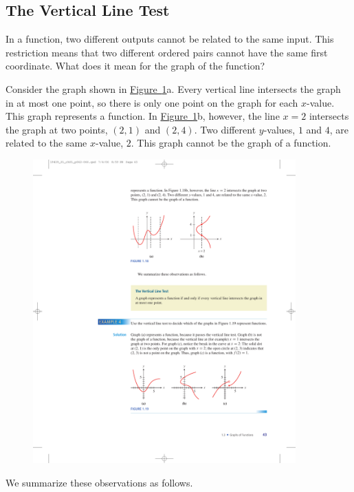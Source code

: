 \documentclass[10pt,]{book}
\theoremstyle{plain}
\theoremstyle{definition}
\theoremstyle{definition}
\theoremstyle{definition}
\theoremstyle{definition}
\theoremstyle{definition}
\numberwithin{equation}{section}
\begin{document}
\subsection[The Vertical Line Test]{The Vertical Line Test}\label{subsection-15}
In a function, two different outputs cannot be related to the same input. This restriction means that two different ordered pairs cannot have the same first coordinate. What does it mean for the graph of the function?%
\par
Consider the graph shown in \hyperref[fig-vertical-line-test]{Figure~\ref{fig-vertical-line-test}}a. Every vertical line intersects the graph in at most one point, so there is only one point on the graph for each \(x\)-value. This graph represents a function. In \hyperref[fig-vertical-line-test]{Figure~\ref{fig-vertical-line-test}}b, however, the line \(x = 2\) intersects the graph at two points, \((2, 1)\) and \((2, 4)\). Two different \(y\)-values, \(1\) and \(4\), are related to the same \(x\)-value, \(2\). This graph cannot be the graph of a function.%
\leavevmode%
\begin{figure}
\centering
\includegraphics[width=0.90\textwidth,]{images/fig-vertical-line-test.pdf}\caption{\label{fig-vertical-line-test}}
\end{figure}
\par
We summarize these observations as follows.%
\typeout{************************************************}
\typeout{************************************************}
\end{document}
